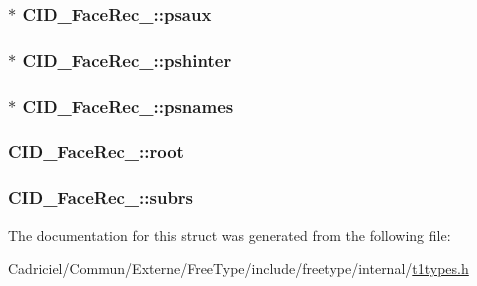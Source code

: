 \hypertarget{struct_c_i_d___face_rec___a8e8c0efc67577803cef0f73fc114470d}{
\subsubsection[{psaux}]{$\ast$ C\-I\-D\-\_\-\-Face\-Rec\-\_\-\-::psaux}}\label{struct_c_i_d___face_rec___a8e8c0efc67577803cef0f73fc114470d}
\hypertarget{struct_c_i_d___face_rec___a8a367e497f72f4d0384103952d73fc08}{
\subsubsection[{pshinter}]{$\ast$ C\-I\-D\-\_\-\-Face\-Rec\-\_\-\-::pshinter}}\label{struct_c_i_d___face_rec___a8a367e497f72f4d0384103952d73fc08}
\hypertarget{struct_c_i_d___face_rec___ab87e41e70c9aa0c32382ce43dda8b32a}{
\subsubsection[{psnames}]{$\ast$ C\-I\-D\-\_\-\-Face\-Rec\-\_\-\-::psnames}}\label{struct_c_i_d___face_rec___ab87e41e70c9aa0c32382ce43dda8b32a}
\hypertarget{struct_c_i_d___face_rec___aeeb09d3feaa016b664e1c5bf95a6f232}{
\subsubsection[{root}]{ C\-I\-D\-\_\-\-Face\-Rec\-\_\-\-::root}}\label{struct_c_i_d___face_rec___aeeb09d3feaa016b664e1c5bf95a6f232}
\hypertarget{struct_c_i_d___face_rec___aa842e3eb5a5092dd0fc2c0ecf7bd692b}{
\subsubsection[{subrs}]{ C\-I\-D\-\_\-\-Face\-Rec\-\_\-\-::subrs}}\label{struct_c_i_d___face_rec___aa842e3eb5a5092dd0fc2c0ecf7bd692b}


The documentation for this struct was generated from the following file\-:\begin{DoxyCompactItemize}
\item 
Cadriciel/\-Commun/\-Externe/\-Free\-Type/include/freetype/internal/\hyperlink{t1types_8h}{t1types.\-h}\end{DoxyCompactItemize}

